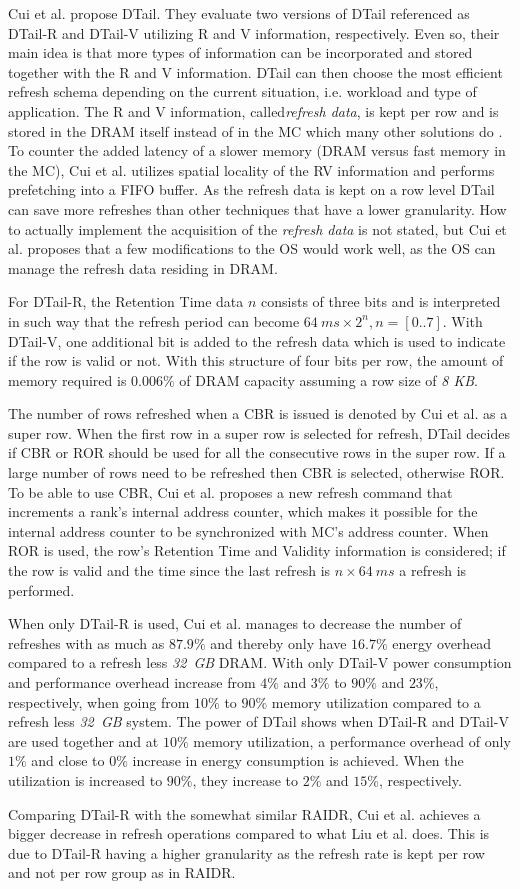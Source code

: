 Cui et al. \cite{dtail} propose DTail. They evaluate two versions of DTail referenced as DTail-R and DTail-V utilizing R and V information, respectively. Even so, their main idea is that more types of  information can be incorporated and stored together with the R and V information. DTail can then choose the most efficient refresh schema depending on the current situation, i.e. workload and type of application. The R and V information, called\textit{refresh data}, is kept per row and is stored in the DRAM itself instead of in the MC which many other solutions do \cite{raidr}\cite{smartrefresh}\cite{refrint}. To counter the added latency of a slower memory (DRAM versus fast memory in the MC), Cui et al. utilizes spatial locality of the RV information and performs prefetching into a FIFO buffer. As the refresh data is kept on a row level DTail can save more refreshes than other techniques that have a lower granularity. How to actually implement the acquisition of the \textit{refresh data} is not stated, but Cui et al. proposes that a few modifications to the OS would work well, as the OS can manage the refresh data residing in DRAM.

For DTail-R, the Retention Time data $n$ consists of three bits and is interpreted in such way that the refresh period can become \(64\:ms \times 2^n, n = [0..7]\). With DTail-V, one additional bit is added to the refresh data which is used to indicate if the row is valid or not. With this structure of four bits per row, the amount of memory required is $0.006\%$ of DRAM capacity assuming a row size of \textit{8 KB}.

The number of rows refreshed when a CBR is issued is denoted by Cui et al. as a super row. When the first row in a super row is selected for refresh, DTail decides if CBR or ROR should be used for all the consecutive rows in the super row. If a large number of rows need to be refreshed then CBR is selected, otherwise ROR. To be able to use CBR, Cui et al. proposes a new refresh command that increments a rank's internal address counter, which makes it possible for the internal address counter to be synchronized with MC's address counter. When ROR is used, the row's Retention Time and Validity information is considered; if the row is valid and the time since the last refresh is $n \times 64\:ms$ a refresh is performed. 

When only DTail-R is used, Cui et al. manages to decrease the number of refreshes with as much as $87.9\%$ and thereby only have $16.7\%$ energy overhead compared to a refresh less \textit{32~GB} DRAM. With only DTail-V power consumption and performance overhead increase from $4\%$ and $3\%$ to $90\%$ and $23\%$, respectively, when going from $10\%$ to $90\%$ memory utilization compared to a refresh less \textit{32~GB} system. The power of DTail shows when DTail-R and DTail-V are used together and at $10\%$ memory utilization, a performance overhead of only $1\%$ and close to $0\%$ increase in energy consumption is achieved. When the utilization is increased to $90\%$, they increase to $2\%$ and $15\%$, respectively.

Comparing DTail-R with the somewhat similar RAIDR, Cui et al. achieves a bigger decrease in refresh operations compared to what Liu et al. does. This is due to DTail-R having a higher granularity as the refresh rate is kept per row and not per row group as in RAIDR.